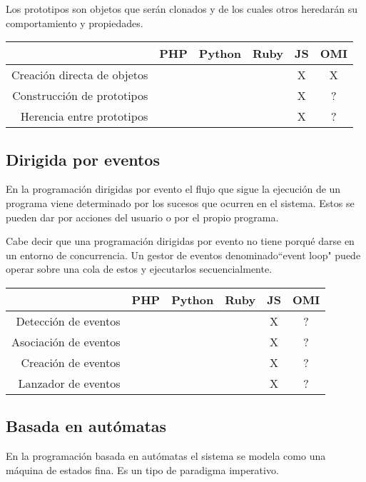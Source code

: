 Los prototipos son objetos que serán clonados y de los cuales otros heredarán su
comportamiento y propiedades.

\FloatBarrier
\begin{table}[h]
\begin{center}
 
\begin{tabular}{|r|c|c|c|c|c|} \hline
 & PHP  & Python & Ruby & JS & OMI\\ \hline
Creación directa de objetos &  &  &  & X & X \\ \hline
Construcción de prototipos &  &  &  & X & ? \\ \hline
Herencia entre prototipos &  &  &  & X & ? \\ \hline
\end{tabular}
\end{center}
\end{table}
\FloatBarrier

\subsection{Dirigida por eventos}
En la programación dirigidas por evento el flujo que sigue la ejecución de un programa viene 
determinado por los sucesos que ocurren en el sistema. Estos se pueden dar por acciones del usuario
o por el propio programa.

Cabe decir que una programación dirigidas por evento no tiene porqué darse en un 
entorno de concurrencia. Un gestor de eventos denominado``event loop" puede operar sobre 
una cola de estos y ejecutarlos secuencialmente.

\FloatBarrier
\begin{table}[h]
\begin{center}
 
\begin{tabular}{|r|c|c|c|c|c|} \hline
 & PHP  & Python & Ruby & JS & OMI\\ \hline
Detección de eventos & & & & X & ? \\ \hline
Asociación de eventos & & & & X & ? \\ \hline  
Creación de eventos & & & & X & ? \\ \hline  
Lanzador de eventos & & & & X & ? \\ \hline  
\end{tabular}
\end{center}
\end{table}
\FloatBarrier

\subsection{Basada en autómatas}
En la programación basada en autómatas el sistema se modela
como una máquina de estados fina. Es un tipo de paradigma imperativo.

